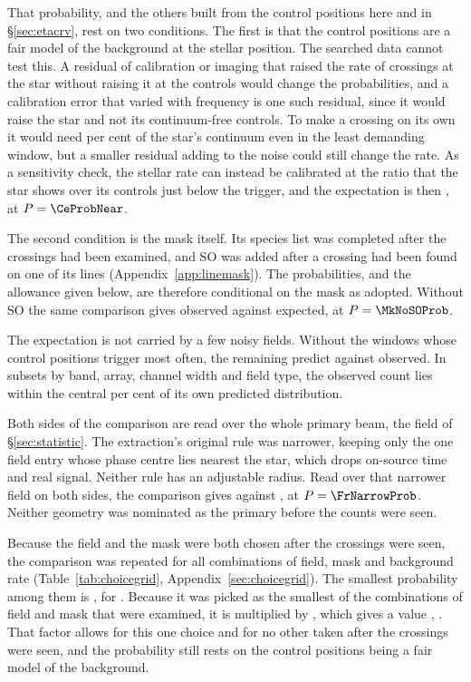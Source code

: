 That probability, and the others built from the control positions here and
in \S\ref{sec:etacrv}, rest on two conditions. The first is that the control
positions are a fair model of the background at the stellar position. The
searched data cannot test this. A residual of calibration or imaging that
raised the rate of crossings at the star without raising it at the controls
would change the probabilities, and a calibration error that varied with
frequency is one such residual, since it would raise the star and not its
continuum-free controls. To make a crossing on its own it would need
\CyEpsMinPct{} per cent of the star's continuum even in the least demanding
window, but a smaller residual adding to the noise could still change the
rate. As a sensitivity check, the stellar rate can instead be calibrated at
the ratio \CeNear{} that the star shows over its controls just below the
trigger, and the expectation is then \CeExpNear{}, at $P=\CeProbNear$.

The second condition is the mask itself. Its species list was completed
after the crossings had been examined, and SO was added after a crossing had
been found on one of its lines (Appendix~\ref{app:linemask}). The
probabilities, and the allowance given below, are therefore conditional on
the mask as adopted. Without SO the same comparison gives \MkNoSOObs{}
observed against \MkNoSOExp{} expected, at $P=\MkNoSOProb$.

The expectation is not carried by a few noisy fields. Without the
\BgTopNWord{} windows whose control positions trigger most often, the
remaining \BgDropTenNWin{} predict \BgDropTenExp{} against \BgDropTenObs{}
observed. In \BgConfInOf{} subsets by band, array, channel
width and field type, the observed count lies within the central
\CeCovPct{} per cent of its own predicted distribution.

Both sides of the comparison are read over the whole primary beam, the field
of \S\ref{sec:statistic}. The extraction's original rule was narrower,
keeping only the one field entry whose phase centre lies nearest the star,
which drops on-source time and real signal. Neither rule has an adjustable
radius. Read over that narrower field on both sides, the comparison gives
\FrNarrowObs{} against \FrNarrowExp{}, at $P=\FrNarrowProb$. Neither geometry
was nominated as the primary before the counts were seen.

Because the field and the mask were both chosen after the crossings were
seen, the comparison was repeated for all \CgNCellWord{} combinations of
field, mask and background rate (Table~\ref{tab:choicegrid},
Appendix~\ref{sec:choicegrid}). The smallest probability among them is
\CgMinProb, for \CgMinCell. Because it was picked as the smallest
of the \CgNTrialWord{} combinations of field and mask that were examined,
it is multiplied by \CgNTrialWord, which gives a value \CgBonfPhrase,
\CgVerdictClause. That factor allows for this one choice and for no other
taken after the crossings were seen, and the probability still rests on the
control positions being a fair model of the background.

